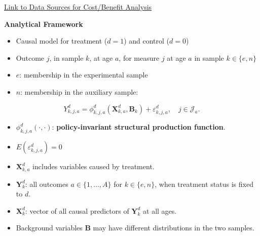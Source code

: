 \documentclass[static]{JJH-Beamer}
\begin{document}
\begin{frame}

\hypertarget{ret:panini}{}
\begin{center}
\hyperlink{panini}{\underline{Link to Data Sources for Cost/Benefit Analysis}}
\end{center}

\end{frame}

\begin{frame}

\begin{center}
\textbf{Analytical Framework}
\end{center}

\end{frame}

\begin{frame}

\begin{itemize}
\item Causal model for treatment ($d=1$) and control ($d=0$)
\item Outcome $j$, in sample $k$, at age $a$, for measure $j$ at age $a$ in sample $k \in \{e,n\}$
\item $e$: membership in the experimental sample
\item $n$: membership in the auxiliary sample:
\end{itemize}

\begin{equation}\label{eq:outcome}
Y^d_{k,j,a} = \phi^d_{k,j,a} (\bm{X}^d_{k,a}, \bm{B}_k) + \varepsilon^d_{k,j,a}, \quad j \in \mathcal{J}_a.
\end{equation}

\end{frame}

\begin{frame}

\begin{itemize}
\item $\phi^d_{k,j,a}\left( \cdot, \cdot \right)$: \textbf{policy-invariant structural production function}.
\item $E(\varepsilon^d_{k,j,a})=0$
\item $\bm{X}^d_{k,a}$ includes variables caused by treatment.
\item $\bm{Y}_k^d$: all outcomes $a\in\{1,\dots,A\}$ for $k \in \{e, n \}$, when treatment status is fixed to $d$.
\item $\bm{X}_k^d$: vector of all causal predictors of $\bm{Y}_k^d$ at all ages.
\item Background variables $\bm{B}$ may have different distributions in the two samples.
\end{itemize}

\end{frame}
\end{document}
